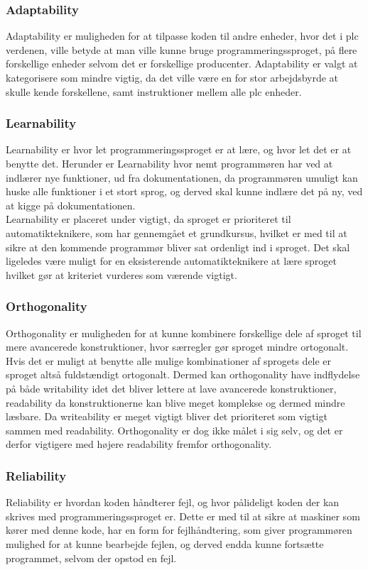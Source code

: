 \subsubsection{Adaptability} Adaptability er muligheden for at tilpasse koden til andre enheder, hvor det i \gls{plc} verdenen, ville betyde at man ville kunne bruge programmeringssproget, på flere forskellige enheder selvom det er forskellige producenter. Adaptability er valgt at kategorisere som mindre vigtig, da det ville være en for stor arbejdsbyrde at skulle kende forskellene, samt instruktioner mellem alle \gls{plc} enheder.

\subsubsection{Learnability} Learnability er hvor let programmeringssproget er at lære, og hvor let det er at benytte det. Herunder er Learnability hvor nemt programmøren har ved at indlærer nye funktioner, ud fra dokumentationen, da programmøren umuligt kan huske alle funktioner i et stort sprog, og derved skal kunne indlære det på ny, ved at kigge på dokumentationen. \\
Learnability er placeret under vigtigt, da sproget er prioriteret til automatikteknikere, som har gennemgået et grundkursus, hvilket er med til at sikre at den kommende programmør bliver sat ordenligt ind i sproget. Det skal ligeledes være muligt for en eksisterende automatikteknikere at lære sproget hvilket gør at kriteriet vurderes som værende vigtigt.

\subsubsection{Orthogonality} Orthogonality er muligheden for at kunne kombinere forskellige dele af sproget til mere avancerede konstruktioner, hvor særregler gør sproget mindre ortogonalt. Hvis det er muligt at benytte alle mulige kombinationer af sprogets dele er sproget altså fuldstændigt ortogonalt. Dermed kan orthogonality have indflydelse på både writability idet det bliver lettere at lave avancerede konstruktioner, readability da konstruktionerne kan blive meget komplekse og dermed mindre læsbare. Da writeability er meget vigtigt bliver det prioriteret som vigtigt sammen med readability. Orthogonality er dog ikke målet i sig selv, og det er derfor vigtigere med højere readability fremfor orthogonality.

\subsubsection{Reliability} Reliability er hvordan koden håndterer fejl, og hvor pålideligt koden der kan skrives med programmeringssproget er. Dette er med til at sikre at maskiner som kører med denne kode, har en form for fejlhåndtering, som giver programmøren mulighed for at kunne bearbejde fejlen, og derved endda kunne fortsætte programmet, selvom der opstod en fejl.

